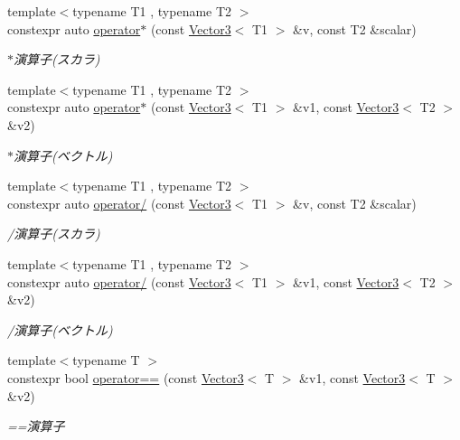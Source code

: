 \begin{DoxyCompactItemize}
{\footnotesize template$<$typename T1 , typename T2 $>$ }\\constexpr auto \mbox{\hyperlink{namespacesaki_a7e8da947afb09174d52b0e4aaa185d71}{operator$\ast$}} (const \mbox{\hyperlink{classsaki_1_1_vector3}{Vector3}}$<$ T1 $>$ \&v, const T2 \&scalar)
\begin{DoxyCompactList}\small\item\em $\ast$演算子(スカラ) \end{DoxyCompactList}\item 
{\footnotesize template$<$typename T1 , typename T2 $>$ }\\constexpr auto \mbox{\hyperlink{namespacesaki_a44134827291df1234e04cbd1837a05ac}{operator$\ast$}} (const \mbox{\hyperlink{classsaki_1_1_vector3}{Vector3}}$<$ T1 $>$ \&v1, const \mbox{\hyperlink{classsaki_1_1_vector3}{Vector3}}$<$ T2 $>$ \&v2)
\begin{DoxyCompactList}\small\item\em $\ast$演算子(ベクトル) \end{DoxyCompactList}\item 
{\footnotesize template$<$typename T1 , typename T2 $>$ }\\constexpr auto \mbox{\hyperlink{namespacesaki_abbbafb6bb5e04aa715db728862e079a8}{operator/}} (const \mbox{\hyperlink{classsaki_1_1_vector3}{Vector3}}$<$ T1 $>$ \&v, const T2 \&scalar)
\begin{DoxyCompactList}\small\item\em /演算子(スカラ) \end{DoxyCompactList}\item 
{\footnotesize template$<$typename T1 , typename T2 $>$ }\\constexpr auto \mbox{\hyperlink{namespacesaki_a7af3750f8a88499eca7784ad18753111}{operator/}} (const \mbox{\hyperlink{classsaki_1_1_vector3}{Vector3}}$<$ T1 $>$ \&v1, const \mbox{\hyperlink{classsaki_1_1_vector3}{Vector3}}$<$ T2 $>$ \&v2)
\begin{DoxyCompactList}\small\item\em /演算子(ベクトル) \end{DoxyCompactList}\item 
{\footnotesize template$<$typename T $>$ }\\constexpr bool \mbox{\hyperlink{namespacesaki_a29747cf04c5a821834f7a1fea39e4050}{operator==}} (const \mbox{\hyperlink{classsaki_1_1_vector3}{Vector3}}$<$ T $>$ \&v1, const \mbox{\hyperlink{classsaki_1_1_vector3}{Vector3}}$<$ T $>$ \&v2)
\begin{DoxyCompactList}\small\item\em ==演算子 \end{DoxyCompactList}\item 

\end{DoxyCompactItemize}
